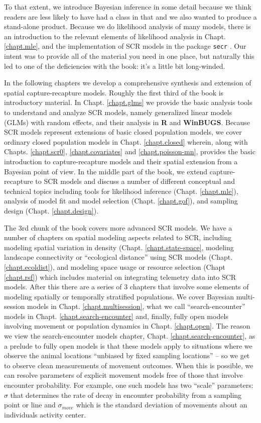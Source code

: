 To that extent, we introduce Bayesian inference in some detail because
we think readers are less
likely to have had a class in that and we also wanted to produce a
stand-alone product.  Because we do likelihood analysis of many models,
there is an introduction to the relevant elements of likelihood
analysis in Chapt. \ref{chapt.mle}, and the implementation of SCR
models in the package \mbox{\tt secr} \citep{efford_etal:2009euring}.
Our intent was to provide all of the material you
need in one place, but naturally this led to one of the deficiencies with the
book: it's a little bit long-winded.  

In the following chapters we develop a comprehensive synthesis and
extension of spatial capture-recapture models.  Roughly the first
third of the book is introductory material. In Chapt. \ref{chapt.glms}
we provide the basic analysis tools to understand and analyze SCR
models, namely generalized linear models (GLMs) with random effects,
and their analysis in {\bf R} and {\bf WinBUGS}.  Because SCR models
represent extensions of basic closed population models, we cover
ordinary closed population models in Chapt. \ref{chapt.closed}
wherein, along with Chapts. \ref{chapt.scr0},
\ref{chapt.covariates} and
\ref{chapt.poisson-mn}, 
 provides the basic introduction
to capture-recapture models and their spatial extension from a
Bayesian point of view.
In the middle part of the book,
 we extend capture-recapture to SCR models and discuss a number of
different conceptual and technical topics including tools for
likelihood inference (Chapt. \ref{chapt.mle}),
analysis of model fit and model selection
(Chapt. \ref{chapt.gof}), and 
 sampling design
(Chapt. \ref{chapt.design}).   

The 3rd chunk of the book covers more advanced SCR models. 
We have a number of chapters on spatial modeling
 aspects related to SCR, including modeling spatial variation in
 density (Chapt. \ref{chapt.state-space}, modeling landscape
 connectivity or ``ecological distance'' using SCR models
 (Chapt. \ref{chapt.ecoldist}), and modeling space usage
or resource selection (Chapt \ref{chapt.rsf}) which includes material
on integrating telemetry data into SCR models. 
After this there are a series of 3 chapters that involve some elements
of modeling 
spatially or temporally stratified populations. 
We cover Bayesian multi-session models in
Chapt. \ref{chapt.multisession}, what we call ``search-encounter''
models in Chapt. \ref{chapt.search-encounter} and, finally, fully open
models involving movement or population dynamics in 
Chapt. \ref{chapt.open}.  The reason we view the search-encounter
models chapter, 
Chapt. \ref{chapt.search-encounter}, as a prelude to fully open
models is that these models apply to situations where we observe the
animal locations ``unbiased by fixed sampling locations'' -- so we get
to observe clean measurements of movement outcomes. When this is
possible, we can resolve parameters of explicit movement models free
of those that involve encounter probability.  For example, one such
models has two ``scale'' parameters: $\sigma$ that determines the rate
of decay in encounter probability from a sampling point or line and
$\sigma_{move}$ which is the standard deviation of movements about an
individuals activity center. 

